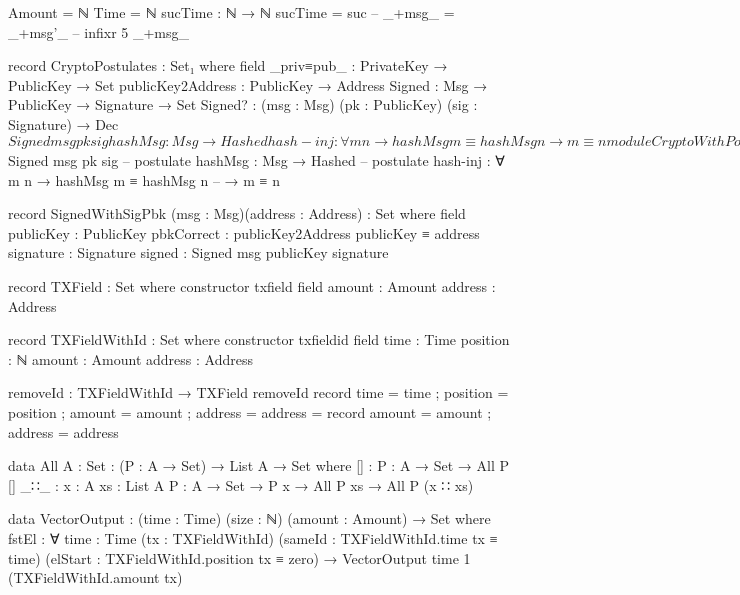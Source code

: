 \documentclass{beamer}
\begin{document}
\begin{code}
  Amount = ℕ
  Time = ℕ
  sucTime : ℕ → ℕ
  sucTime = suc
  -- _+msg_ = _+msg'_
  -- infixr 5 _+msg_

  record CryptoPostulates : Set₁ where
    field
      _priv≡pub_ : PrivateKey → PublicKey → Set
      publicKey2Address : PublicKey → Address
      Signed : Msg → PublicKey → Signature → Set
      Signed? : (msg : Msg) (pk : PublicKey)
        (sig : Signature) → Dec $ Signed msg pk sig
      hashMsg : Msg → Hashed
      hash-inj : ∀ m n → hashMsg m ≡ hashMsg n
                  → m ≡ n

  module CryptoWithPostulates
    (crypto-postulates : CryptoPostulates)
    where

    open CryptoPostulates crypto-postulates

-- infixr 5 _+msg_

-- postulate _priv≡pub_ : PrivateKey → PublicKey → Set
-- postulate publicKey2Address : PublicKey → Address
-- postulate Signed : Msg → PublicKey → Signature → Set
-- postulate Signed? : (msg : Msg) (pk : PublicKey)
--             (sig : Signature) → Dec $ Signed msg pk sig
-- postulate hashMsg : Msg → Hashed
-- postulate hash-inj : ∀ m n → hashMsg m ≡ hashMsg n
--             → m ≡ n

    record SignedWithSigPbk (msg : Msg)(address : Address)
      : Set where
      field
        publicKey   :  PublicKey
        pbkCorrect  :  publicKey2Address publicKey ≡ address
        signature   :  Signature
        signed      :  Signed msg publicKey signature

    record TXField : Set where
      constructor txfield
      field
        amount  : Amount
        address : Address

    record TXFieldWithId : Set where
      constructor txfieldid
      field
        time     : Time
        position : ℕ
        amount   : Amount
        address  : Address

    removeId : TXFieldWithId → TXField
    removeId record { time = time ; position = position ; amount = amount ; address = address }
      = record { amount = amount ; address = address }

    data All {A : Set} : (P : A → Set) → List A → Set where
      [] : {P : A → Set} → All P []
      _∷_ : {x : A} {xs : List A} {P : A → Set} → P x → All P xs → All P (x ∷ xs)


    data VectorOutput : (time : Time) (size : ℕ) (amount : Amount) → Set where
      fstEl : ∀ {time : Time}
        (tx : TXFieldWithId)
        (sameId : TXFieldWithId.time tx ≡ time)
        (elStart : TXFieldWithId.position tx ≡ zero)
        → VectorOutput time 1 (TXFieldWithId.amount tx)


\end{code}
\end{document}
